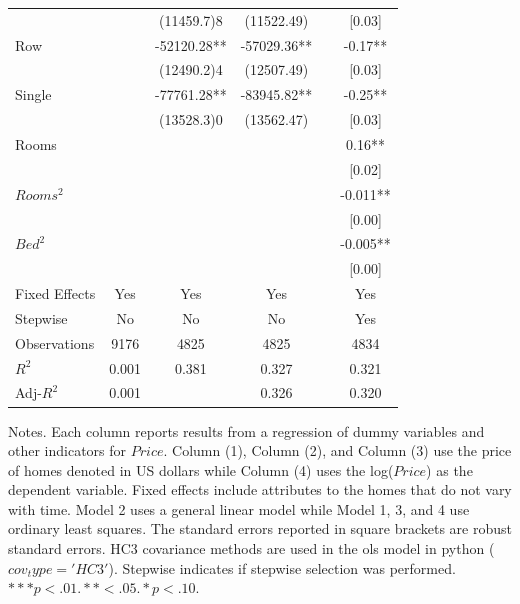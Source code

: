 \documentclass[12pt]{report}
\begin{document}
\begin{table}[h!]
\begin{threeparttable}
\begin{tabular}{lccccc}
& & \footnotesize(11459.7)8& \footnotesize(11522.49)&& \footnotesize[0.03] \\
Row& & -52120.28\footnotesize***& -57029.36\footnotesize***&& -0.17\footnotesize*** \\
& & \footnotesize(12490.2)4& \footnotesize(12507.49)&& \footnotesize[0.03] \\
Single& & -77761.28\footnotesize***& -83945.82\footnotesize***&& -0.25\footnotesize*** \\
& & \footnotesize(13528.3)0& \footnotesize(13562.47)&& \footnotesize[0.03]\\
Rooms& & & && 0.16\footnotesize***\\
& & & && \footnotesize[0.02] \\
$Rooms^2$& & & && -0.011\footnotesize*** \\
& & & && \footnotesize[0.00] \\
$Bed^2$& & & && -0.005\footnotesize*** \\
& & && & \footnotesize[0.00] \\
Fixed Effects & Yes& Yes & Yes & & Yes \\ [0.5ex]
Stepwise & No& No & No & & Yes \\ [0.5ex]
Observations& 9176 & 4825& 4825 && 4834 \\ [0.5ex]
$R^2$ & 0.001 & 0.381& 0.327 && 0.321 \\ [0.5ex]
Adj-$R^2$& 0.001& & 0.326 & & 0.320 \\ [0.5ex]
\hline
\bottomrule
\end{tabular}
\begin{tablenotes}
\item \footnotesize{Notes. Each column reports results from a regression of dummy variables and other indicators for $Price$. Column (1), Column (2), and Column (3) use the price of homes denoted in US dollars while Column (4) uses the log($Price$) as the dependent variable. Fixed effects include attributes to the homes that do not vary with time. Model 2 uses a general linear model while Model 1, 3, and 4 use ordinary least squares. The standard errors reported in square brackets are robust standard errors. HC3 covariance methods are used in the ols model in python ($cov_type='HC3'$). Stepwise indicates if stepwise selection was performed. $***p<.01. **<.05. *p<.10.$}

\end{tablenotes}
\label{table:2}
\end{threeparttable}
\end{table}
\clearpage
\end{document}
